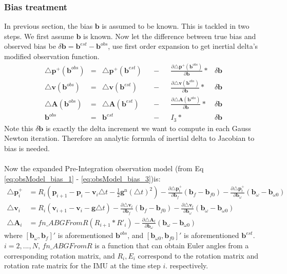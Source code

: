 \documentclass[12pt]{article}   %
\begin{document}
\subsubsection{Bias treatment}
In previous section, the bias $\bm{b}$ is assumed to be known. This is tackled in two steps. We first assume $\bm{b}$ is known. Now let the difference between true bias and observed bias be $\delta \bm{b} = \bm{b}^{est} - \bm{b}^{obs}$, use first order expansion to get inertial delta's modified observation function.
\begin{align}
\triangle \bm{p}^+(\bm{b}^{obs}) &=& \triangle \bm{p}^+(\bm{b}^{est})& &- & &\frac{\partial {\triangle \bm{p}^+(\bm{b}^{obs})}}{\partial \bm{b}}  *&\delta \bm{b} 
\label{eq:obsModel_bias_1}\\
\triangle \bm{v}(\bm{b}^{obs}) &=& \triangle \bm{v}(\bm{b}^{est})& &- & & \frac{\partial {\triangle \bm{v}(\bm{b}^{obs})}}{\partial \bm{b}}*& \delta \bm{b} 
\label{eq:obsModel_bias_2}\\
\triangle \bm{A}(\bm{b}^{obs}) &=& \triangle \bm{A}(\bm{b}^{est})& &- & &\frac{\partial {\triangle \bm{A}(\bm{b}^{obs})}}{\partial \bm{b}}*& \delta \bm{b}
\label{eq:obsModel_bias_3}\\
\bm{b}^{obs} &=& \bm{b}^{est}& &- & & I_3*&\delta \bm{b}
\end{align}
Note this $\delta \bm{b}$ is exactly the delta increment we want to compute in each Gauss Newton iteration. Therefore an analytic formula of inertial delta to Jacobian to bias is needed.\\ \\
Now the expanded Pre-Integration observation model (from Eq \ref{eq:obsModel_bias_1} - \ref{eq:obsModel_bias_3})is:
\begin{align}
\triangle \textbf{p}^+_i &= R_i (\textbf{p}_{i+1} - \textbf{p}_i - \textbf{v}_i \triangle t - \frac{1}{2} \textbf{g}^{\mathrm{n}} {(\triangle t)}^2) - \frac{\partial \triangle \textbf{p}^+_t}{\partial \textbf{b}_f} (\textbf{b}_f - \textbf{b}_{f0}) -  \frac{\partial \triangle \textbf{p}^+_t}{\partial \textbf{b}_\omega} (\textbf{b}_\omega - \textbf{b}_{\omega0})\\
\triangle  \textbf{v}_i &= R_i (\textbf{v}_{i+1} - \textbf{v}_i - \textbf{g} \triangle t) - \frac{\partial \triangle \textbf{v}_t}{\partial \textbf{b}_f} (\textbf{b}_f - \textbf{b}_{f0}) -  \frac{\partial \triangle \textbf{v}_t}{\partial \textbf{b}_\omega} (\textbf{b}_\omega - \textbf{b}_{\omega0})\\
\triangle \textbf{A}_i &= fn\_ABGFromR(R_{i+1}*R'_{i}) - \frac{\partial \triangle \textbf{A}_t}{\partial \textbf{b}_\omega} (\textbf{b}_\omega - \textbf{b}_{\omega0})
\end{align}
where $[\textbf{b}_\omega, \textbf{b}_f]'$ is aforementioned $\textbf{b}^{obs}$, and $[\textbf{b}_{\omega0}, \textbf{b}_{f0}]'$ is aforementioned $\textbf{b}^{est}$. $i = 2,..., N$, $fn\_ABGFromR$ is a function that can obtain Euler angles from a corresponding rotation matrix, and $R_i, E_i$ correspond to the rotation matrix and rotation rate matrix for the IMU at the time step $i$. respectively.
\end{document}
